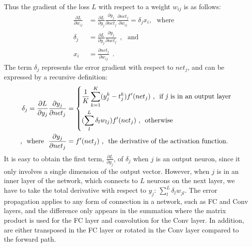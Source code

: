 Thus the gradient of the loss $L$ with respect to a weight $w_{ij}$ is as follows:
\begin{equation}
\begin{aligned}
\frac{\partial L}{\partial w_{ij}} &= \frac{\partial L}{\partial y_j} \frac{\partial y_j}{\partial net_j} \frac{\partial net_j}{\partial w_{ij}} = \delta_j x_i , \textrm{~~where~~}\\
 \delta_j &=  \frac{\partial L}{\partial y_j} \frac{\partial y_j}{\partial net_j}~~,  \textrm{~~and~~}\\
x_i &= \frac{\partial net_j}{\partial w_{ij}}~~.
\end{aligned}
\end{equation}
The term $ \delta_j $ represents the error gradient with respect to $net_j$, and can be expressed by a recursive definition:
\begin{equation}
\begin{aligned}
\delta_j =  \frac{\partial L}{\partial y_j} \frac{\partial y_j}{\partial net_j} &= \left\{
\begin{aligned}
&\frac{1}{K}\sum_{k=1}^K (y^{k}_{j}-t^{k}_{j}) f'(net_j)  \textrm{~,~~if \textit{j} is in an output layer} \\
&(\sum_l^L \delta_l w_{lj}) f'(net_j)  \textrm{~,~~otherwise}
\end{aligned}
\right. \\
\textrm{,~~where~~} \frac{\partial y_j}{\partial net_j} &=  f'(net_j) \textrm{~,~~the derivative of the activation function}.
\end{aligned}
\label{equ:derivative}
\end{equation}
It is easy to obtain the first term, $ \frac{\partial L}{\partial y_j}  $, of $ \delta_j $ when $j$ is an output neuron, since it only involves a single dimension of the output vector.
However, when $j$ is in an inner layer of the network, which connects to $L$ neurons on the next layer, we have to take the total derivative with respect to $y_j$: $\sum_l^L \delta_l w_{jl}$.
The error propagation applies to any form of connection in a network, such as FC and Conv layers, and the difference only appears in the summation where the matrix product is used for the FC layer and convolution for the Conv layer.
In addition, \DIFdelbegin {}\DIFdelend \DIFaddbegin {}\DIFaddend are either transposed in the FC layer or rotated in the Conv layer compared to the forward path.


